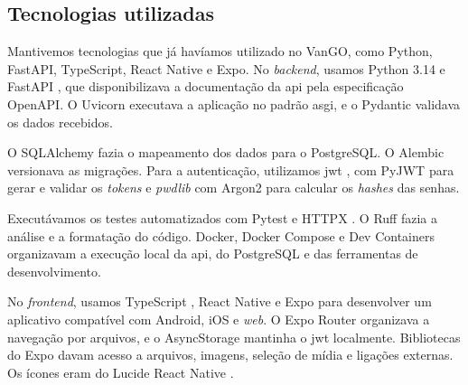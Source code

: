 {\footnotesize{}}

\subsection{Tecnologias utilizadas}

Mantivemos tecnologias que já havíamos utilizado no VanGO, como Python,
FastAPI, TypeScript, React Native e Expo. No \textit{backend}, usamos Python
3.14 \cite{python-docs} e FastAPI \cite{fastapi-docs}, que disponibilizava a
documentação da \ac{api} pela especificação OpenAPI. O Uvicorn
\cite{uvicorn-docs} executava a aplicação no padrão \ac{asgi}, e o Pydantic
\cite{pydantic-docs} validava os dados recebidos.

O SQLAlchemy \cite{sqlalchemy-docs} fazia o mapeamento dos dados para o
PostgreSQL. O Alembic \cite{alembic-docs} versionava as migrações. Para a autenticação, utilizamos
\ac{jwt} \cite{jwt-rfc}, com PyJWT \cite{pyjwt-docs} para gerar e validar os
\textit{tokens} e \textit{pwdlib} \cite{pwdlib-docs} com Argon2 para calcular
os \textit{hashes} das senhas.

Executávamos os testes automatizados com Pytest \cite{pytest-docs} e HTTPX
\cite{httpx-docs}. O Ruff fazia a análise e a formatação do código. Docker,
Docker Compose e Dev Containers \cite{docker-docs} organizavam a execução
local da \ac{api}, do PostgreSQL e das ferramentas de desenvolvimento.

No \textit{frontend}, usamos TypeScript \cite{typescript-docs}, React Native
\cite{react-native-docs} e Expo \cite{expo-docs} para desenvolver um aplicativo
compatível com Android, iOS e \textit{web}. O Expo Router organizava a
navegação por arquivos, e o AsyncStorage mantinha o \ac{jwt} localmente.
Bibliotecas do Expo davam acesso a arquivos, imagens, seleção de mídia e
ligações externas. Os ícones eram do Lucide React Native \cite{lucide-docs}.
